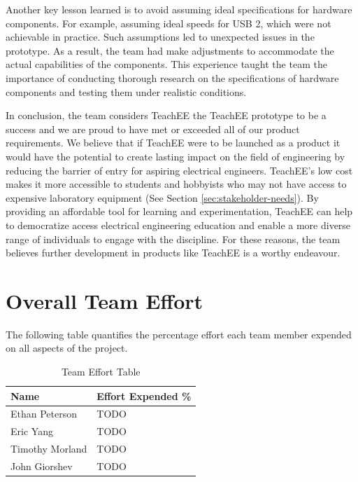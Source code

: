\documentclass[letterpaper,11pt]{article}
\begin{document}
Another key lesson learned is to avoid assuming ideal specifications for hardware
components. For example, assuming ideal speeds for USB 2, which were not
achievable in practice. Such assumptions led to unexpected issues in the
prototype. As a result, the team had make adjustments to accommodate the actual
capabilities of the components. This experience taught the team the importance
of conducting thorough research on the specifications of hardware components
and testing them under realistic conditions.

In conclusion, the team considers TeachEE the TeachEE prototype to be a success
and we are proud to have met or exceeded all of our product requirements. We
believe that if TeachEE were to be launched as a product it would have the
potential to create lasting impact on the field of engineering by reducing the
barrier of entry for aspiring electrical engineers. TeachEE's low cost makes it
more accessible to students and hobbyists who may not have access to expensive
laboratory equipment (See Section \ref{sec:stakeholder-needs}). By providing an
affordable tool for learning and experimentation, TeachEE can help to
democratize access electrical engineering education and enable a more diverse
range of individuals to engage with the discipline. For these reasons, the team
believes further development in products like TeachEE is a worthy endeavour.

\section{Overall Team Effort}
The following table quantifies the percentage effort each team member expended
on all aspects of the project.


\begin{table}[H]
  \caption{Team Effort Table}
  \centering
  \begin{tabularx}{10cm}{l|l}
    \textbf{Name} & \textbf{Effort Expended \%}\\
    \hline
    Ethan Peterson & TODO \\
    \hline
    Eric Yang & TODO \\
    \hline
    Timothy Morland & TODO \\
    \hline
    John Giorshev & TODO \\
  \end{tabularx} 
\end{table}
\newpage
\end{document}
